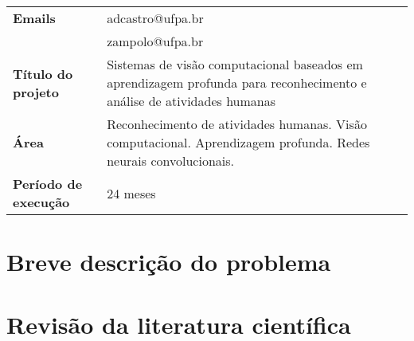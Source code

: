 \begin{table}[!th]
\begin{tabular}{|l p{}|}
\textbf{Emails}               & adcastro@ufpa.br\\
	                      & zampolo@ufpa.br\\
\textbf{Título do projeto}    & Sistemas de visão computacional baseados em aprendizagem profunda para reconhecimento e análise de atividades humanas\\
\textbf{Área}                 & Reconhecimento de atividades humanas. Visão computacional. Aprendizagem profunda. Redes neurais convolucionais.\\
\textbf{Período de execução}  & 24 meses\\
\hline
\end{tabular}
\end{table}
\newpage

\tableofcontents\newpage


%

\section{Breve descrição do problema}
\label{sec:descr}

\newpage

\section{Revisão da literatura científica}
\label{sec:rev}

\newpage

%


